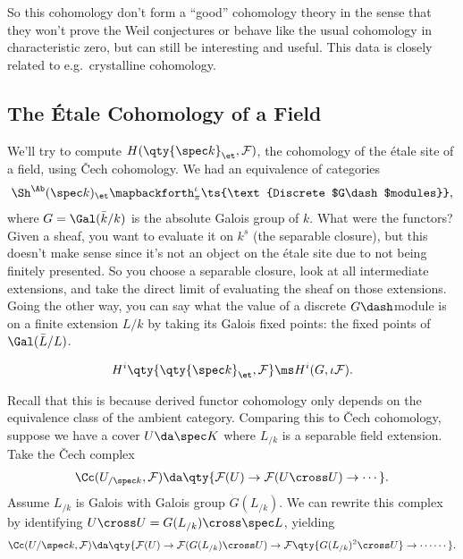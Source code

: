 \begin{remark}

So this cohomology don't form a ``good'' cohomology theory in the sense
that they won't prove the Weil conjectures or behave like the usual
cohomology in characteristic zero, but can still be interesting and
useful. This data is closely related to e.g.~crystalline cohomology.

\end{remark}

\hypertarget{the-uxe9tale-cohomology-of-a-field}{%
\subsection{The Étale Cohomology of a
Field}\label{the-uxe9tale-cohomology-of-a-field}}

\begin{example}[?]

We'll try to compute \(H(\qty{\spec k}_\et, \mathcal{F})\), the
cohomology of the étale site of a field, using Čech cohomology. We had
an equivalence of categories
\begin{align*}  
\Sh^\Ab(\spec k)_\et \mapbackforth^{\iota}_{\pi} \ts{\text{Discrete $G\dash$modules}}
,\end{align*} where \(G = \Gal(\bar k / k)\) is the absolute Galois
group of \(k\). What were the functors? Given a sheaf, you want to
evaluate it on \(k^s\) (the separable closure), but this doesn't make
sense since it's not an object on the étale site due to not being
finitely presented. So you choose a separable closure, look at all
intermediate extensions, and take the direct limit of evaluating the
sheaf on those extensions. Going the other way, you can say what the
value of a discrete \(G\dash\)module is on a finite extension \(L/k\) by
taking its Galois fixed points: the fixed points of \(\Gal(\bar L/L)\).

\begin{corollary}[?]

\begin{align*}  
H^i\qty{\qty{ \spec k}_\et, \mathcal{F}} \ms H^i(G, \iota \mathcal{F})
.\end{align*}

\end{corollary}

Recall that this is because derived functor cohomology only depends on
the equivalence class of the ambient category. Comparing this to Čech
cohomology, suppose we have a cover \(U \da \spec K\) where \(L_{/k}\)
is a separable field extension. Take the Čech complex
\begin{align*}  
\Cc(U_{/\spec k}, \mathcal{F}) \da \qty{\mathcal{F}(U) \to \mathcal{F}(U\cross U) \to \cdots}
.\end{align*} Assume \(L_{/k}\) is Galois with Galois group
\(G(L_{/k})\). We can rewrite this complex by identifying
\(U\cross U = G(L_{/k}) \cross \spec L\), yielding
\begin{align*}  
\Cc(U/\spec k, \mathcal{F}) \da \qty{\mathcal{F}(U) \to \mathcal{F}(G(L_{/k}) \cross U) \to \mathcal{F}\qty{G(L_{/k})^2 \cross U}
\to \cdots
\cdots}
.\end{align*}


\end{example}
